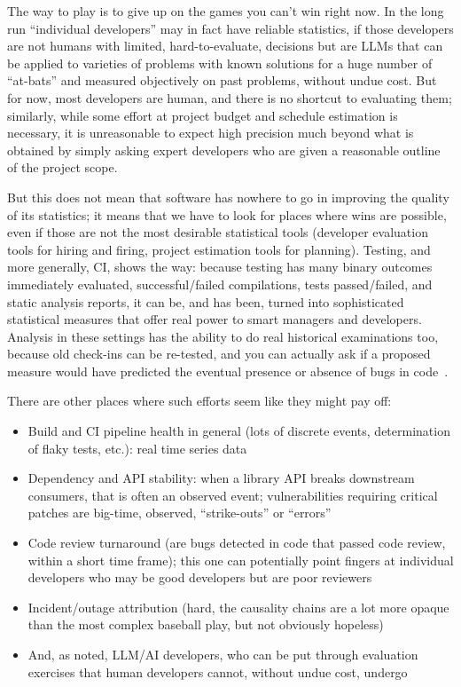 \documentclass[sigplan,screen]{acmart}
\begin{document}
The way to play is to give up on the games you can't win right now.  In
the long run ``individual developers'' may in fact have reliable
statistics, if those developers are not humans with limited,
hard-to-evaluate, decisions but are LLMs that can be applied to
varieties of problems with known solutions for a huge number of
``at-bats'' and measured objectively on past problems, without undue
cost.  But for now, most developers are human, and there is no
shortcut to evaluating them; similarly, while some effort at project
budget and schedule estimation is necessary, it is unreasonable to
expect high precision much beyond what is obtained by simply asking expert
developers who are given a reasonable outline of the project scope.

But this does not mean that software has nowhere to go in improving
the quality of its statistics; it means that we have to look for
places where wins are possible, even if those are not the most
desirable statistical tools (developer evaluation tools for hiring and
firing,
project estimation tools for planning).  Testing, and more generally, CI, shows the way:
because testing has many binary outcomes immediately evaluated, 
successful/failed compilations, tests passed/failed, and static
analysis reports, it can be, and has been, turned into sophisticated
statistical measures that offer real power to smart managers and
developers.  Analysis in these settings has the ability to do real
historical examinations too, because old check-ins can be re-tested,
and you can actually ask if a proposed measure would have predicted
the eventual presence or absence of bugs in code~\cite{testedness}.

There are other places where such efforts seem like they might pay off:
\begin{itemize}
  \item Build and CI pipeline health in general (lots of discrete
  events, determination of flaky tests, etc.): real time series data
  \item Dependency and API stability:  when a library API breaks
    downstream consumers, that is often an observed event;
    vulnerabilities requiring critical patches are big-time, observed,
    ``strike-outs'' or ``errors''
    \item Code review turnaround (are bugs detected in code that
      passed code review, within a short time frame); this one can
      potentially point fingers at individual developers who may be good
      developers but are poor reviewers
    \item Incident/outage attribution (hard, the causality chains are a
      lot more opaque than the most complex baseball play, but not
      obviously hopeless)
      \item And, as noted, LLM/AI developers, who can be put through
        evaluation exercises that human developers cannot, without undue cost, undergo
      \end{itemize}
\end{document}
